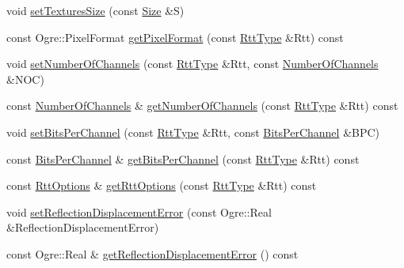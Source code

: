 \begin{CompactItemize}
\begin{CompactItemize}
\item 
void \hyperlink{class_hydrax_1_1_rtt_manager_d54dd87efa7baa4a5037faa2e5241738}{setTexturesSize} (const \hyperlink{struct_hydrax_1_1_size}{Size} \&S)
\item 
const Ogre::PixelFormat \hyperlink{class_hydrax_1_1_rtt_manager_e94c4a88b240d9b7be93aa6c1430d2b6}{getPixelFormat} (const \hyperlink{class_hydrax_1_1_rtt_manager_9753d012b355eba64cff2b19bb6f76ed}{RttType} \&Rtt) const 
\item 
void \hyperlink{class_hydrax_1_1_rtt_manager_009e9c7631dad8d588790401cab753b6}{setNumberOfChannels} (const \hyperlink{class_hydrax_1_1_rtt_manager_9753d012b355eba64cff2b19bb6f76ed}{RttType} \&Rtt, const \hyperlink{class_hydrax_1_1_rtt_manager_8f74f31025f23f6ed8930a0d79a70731}{NumberOfChannels} \&NOC)
\item 
const \hyperlink{class_hydrax_1_1_rtt_manager_8f74f31025f23f6ed8930a0d79a70731}{NumberOfChannels} \& \hyperlink{class_hydrax_1_1_rtt_manager_88b7c387e413cf219f399926c2dbea7e}{getNumberOfChannels} (const \hyperlink{class_hydrax_1_1_rtt_manager_9753d012b355eba64cff2b19bb6f76ed}{RttType} \&Rtt) const 
\item 
void \hyperlink{class_hydrax_1_1_rtt_manager_fe968a7c8f23a6fa9b0d5b499ef09491}{setBitsPerChannel} (const \hyperlink{class_hydrax_1_1_rtt_manager_9753d012b355eba64cff2b19bb6f76ed}{RttType} \&Rtt, const \hyperlink{class_hydrax_1_1_rtt_manager_ab09efbd8ec25f88656a27d6a4f0446e}{BitsPerChannel} \&BPC)
\item 
const \hyperlink{class_hydrax_1_1_rtt_manager_ab09efbd8ec25f88656a27d6a4f0446e}{BitsPerChannel} \& \hyperlink{class_hydrax_1_1_rtt_manager_a0834735c92a9f72f34eaee8e6478343}{getBitsPerChannel} (const \hyperlink{class_hydrax_1_1_rtt_manager_9753d012b355eba64cff2b19bb6f76ed}{RttType} \&Rtt) const 
\item 
const \hyperlink{struct_hydrax_1_1_rtt_manager_1_1_rtt_options}{RttOptions} \& \hyperlink{class_hydrax_1_1_rtt_manager_3d6990b4cbbe6da2e1580b289f5329fd}{getRttOptions} (const \hyperlink{class_hydrax_1_1_rtt_manager_9753d012b355eba64cff2b19bb6f76ed}{RttType} \&Rtt) const 
\item 
void \hyperlink{class_hydrax_1_1_rtt_manager_7b473a60a06df9d943a50939e3b26377}{setReflectionDisplacementError} (const Ogre::Real \&ReflectionDisplacementError)
\item 
const Ogre::Real \& \hyperlink{class_hydrax_1_1_rtt_manager_021cdc044e7f215158dc3747419db037}{getReflectionDisplacementError} () const 
\item 

\end{CompactItemize}
\end{CompactItemize}
